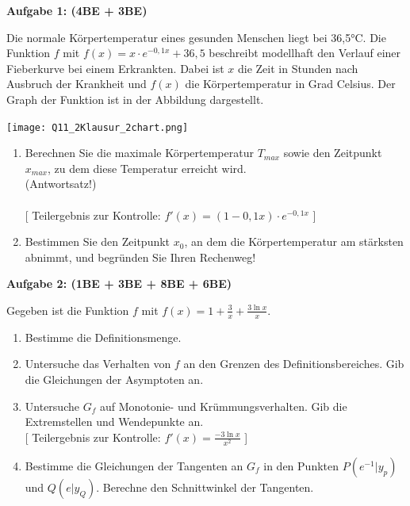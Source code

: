 \documentclass[a4paper,12pt]{article}
\newcommand{\Aufgabe}[1]{
  {
  \vspace*{0.5cm}
  \textsf{\textbf{Aufgabe #1}}
  \vspace*{0.2cm}
  
  }
}
\begin{document}
\vspace{5cm}

\newpage


\Aufgabe{1: (4BE + 3BE)}
Die normale Körpertemperatur eines gesunden Menschen liegt bei 36,5°C.  Die Funktion $f$ mit $f(x) = x \cdot e^{-0,1x} + 36,5$ beschreibt modellhaft den Verlauf einer Fieberkurve bei einem Erkrankten.  Dabei ist $x$ die Zeit in Stunden nach Ausbruch der Krankheit und $f(x)$ die Körpertemperatur in Grad Celsius. Der Graph der Funktion ist in der Abbildung dargestellt.

\begin{center}
\texttt{[image: Q11\_2Klausur\_2chart.png]}
\end{center}

\begin{enumerate}[label={\alph*)}]
  \item Berechnen Sie die maximale Körpertemperatur $T_{max}$ sowie den Zeitpunkt $x_{max}$, zu dem diese Temperatur erreicht wird.\\
(Antwortsatz!)\\
\\
    {[ Teilergebnis zur Kontrolle: $f'(x) = (1-0,1x) \cdot e^{-0,1x}$ ]}
  \item Bestimmen Sie den Zeitpunkt $x_0$, an dem die Körpertemperatur am stärksten abnimmt, und begründen Sie Ihren Rechenweg!
\end{enumerate}

\newpage

\Aufgabe{2: (1BE + 3BE + 8BE + 6BE)}

Gegeben ist die Funktion $f$ mit $f(x)=1+\frac{3}{x}+\frac{3 \ln x}{x}$.

\begin{enumerate}[label={\alph*)}]
  \item Bestimme die Definitionsmenge.
  \item Untersuche das Verhalten von $f$ an den Grenzen des Definitionsbereiches. Gib die Gleichungen der Asymptoten an.
  \item Untersuche $G_f$ auf Monotonie- und Krümmungsverhalten. Gib die Extremstellen und Wendepunkte an.\\
    {[ Teilergebnis zur Kontrolle: $f'(x) = \frac{-3 \ln x}{x^2}$ ]}
  \item Bestimme die Gleichungen der Tangenten an $G_f$ in den Punkten $P(e^{-1} | y_p)$ und $Q(e|y_Q)$. Berechne den Schnittwinkel der Tangenten. 
\end{enumerate}
\end{document}
